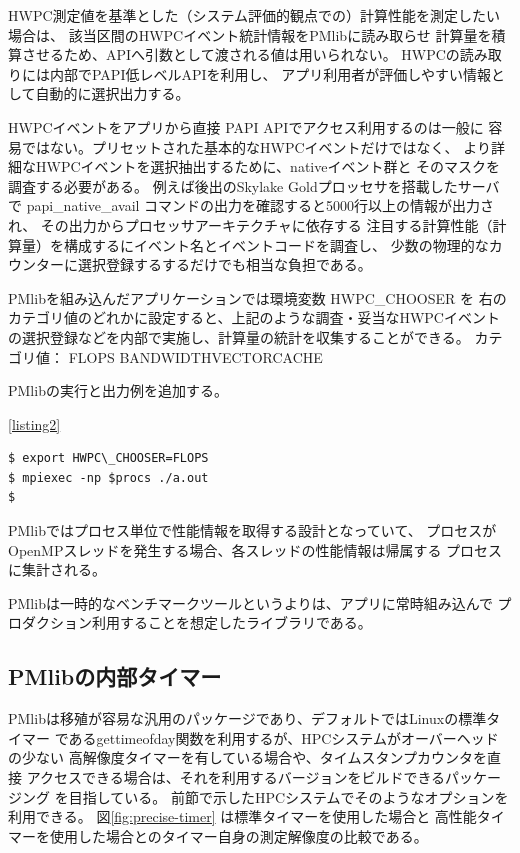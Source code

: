 \documentclass[submit,techrep,noauthor]{ipsj}
\begin{document}
HWPC測定値を基準とした（システム評価的観点での）計算性能を測定したい場合は、
該当区間のHWPCイベント統計情報をPMlibに読み取らせ
計算量を積算させるため、APIへ引数として渡される値は用いられない。
HWPCの読み取りには内部でPAPI低レベルAPIを利用し、
アプリ利用者が評価しやすい情報として自動的に選択出力する。

HWPCイベントをアプリから直接 PAPI APIでアクセス利用するのは一般に
容易ではない。プリセットされた基本的なHWPCイベントだけではなく、
より詳細なHWPCイベントを選択抽出するために、nativeイベント群と
そのマスクを調査する必要がある。
例えば後出のSkylake Goldプロッセサを搭載したサーバで
papi\_native\_avail コマンドの出力を確認すると5000行以上の情報が出力され、
その出力からプロセッサアーキテクチャに依存する
注目する計算性能（計算量）を構成するにイベント名とイベントコードを調査し、
少数の物理的なカウンターに選択登録するするだけでも相当な負担である。

PMlibを組み込んだアプリケーションでは環境変数 HWPC\_CHOOSER を
右のカテゴリ値のどれかに設定すると、上記のような調査・妥当なHWPCイベント
の選択登録などを内部で実施し、計算量の統計を収集することができる。
カテゴリ値：
FLOPS \textbar BANDWIDTH\textbar VECTOR\textbar CACHE

{ \color{blue} \par
PMlibの実行と出力例を追加する。 \par
\lstlistingname \ref{listing2}
\begin{lstlisting}[caption={\hfill},label={listing2},captionpos=t]
$ export HWPC\_CHOOSER=FLOPS
$ mpiexec -np $procs ./a.out
$
\end{lstlisting}
} \par

PMlibではプロセス単位で性能情報を取得する設計となっていて、
プロセスがOpenMPスレッドを発生する場合、各スレッドの性能情報は帰属する
プロセスに集計される。

PMlibは一時的なベンチマークツールというよりは、アプリに常時組み込んで
プロダクション利用することを想定したライブラリである。

\subsection{PMlibの内部タイマー}
PMlibは移殖が容易な汎用のパッケージであり、デフォルトではLinuxの標準タイマー
であるgettimeofday関数を利用するが、HPCシステムがオーバーヘッドの少ない
高解像度タイマーを有している場合や、タイムスタンプカウンタを直接
アクセスできる場合は、それを利用するバージョンをビルドできるパッケージング
を目指している。
前節で示したHPCシステムでそのようなオプションを利用できる。
図\ref{fig:precise-timer} は標準タイマーを使用した場合と
高性能タイマーを使用した場合とのタイマー自身の測定解像度の比較である。
\end{document}
